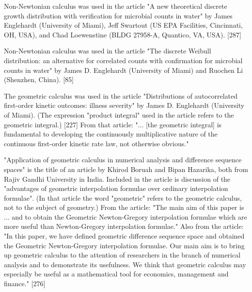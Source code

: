 \documentclass[12pt]{article}
\begin{document}
Non-Newtonian calculus was used in the article "A new theoretical discrete growth distribution with verification for microbial counts in water" by James Englehardt (University of Miami), Jeff Swartout (US EPA Facilities, Cincinnati, OH, USA), and Chad Loewenstine (BLDG 27958-A, Quantico, VA, USA). [287]

Non-Newtonian calculus was used in the article "The discrete Weibull distribution: an alternative for correlated counts with confirmation for microbial counts in water" by James D. Englehardt (University of Miami) and Ruochen Li (Shenzhen, China). [85] 

The geometric calculus was used in the article "Distributions of autocorrelated first-order kinetic outcomes: illness severity" by James D. Englehardt (University of Miami). (The expression "product integral" used in the article refers to the geometric integral.) [227] From that article: "... [the geometric integral] is fundamental to developing the continuously multiplicative nature of the continuous first-order kinetic rate law, not otherwise obvious."

"Application of geometric calculus in numerical analysis and difference sequence spaces" is the title of an article by Khirod Boruah and Bipan Hazarika, both from Rajiv Gandhi University in India. Included in the article is discussion of the "advantages of geometric interpolation formulae over ordinary interpolation formulae". (In that article the word "geometric" refers to the geometric calculus, not to the subject of geometry.) From the article: "The main aim of this paper is ... and to obtain the Geometric Newton-Gregory interpolation formulae which are more useful than Newton-Gregory interpolation formulae." Also from the article: "In this paper, we have defined geometric difference sequence space and obtained the Geometric Newton-Gregory interpolation formulae. Our main aim is to bring up geometric calculus to the attention of researchers in the branch of numerical analysis and to demonstrate its usefulness. We think that geometric calculus may especially be useful as a mathematical tool for economics, management and finance." [276]
\end{document}
